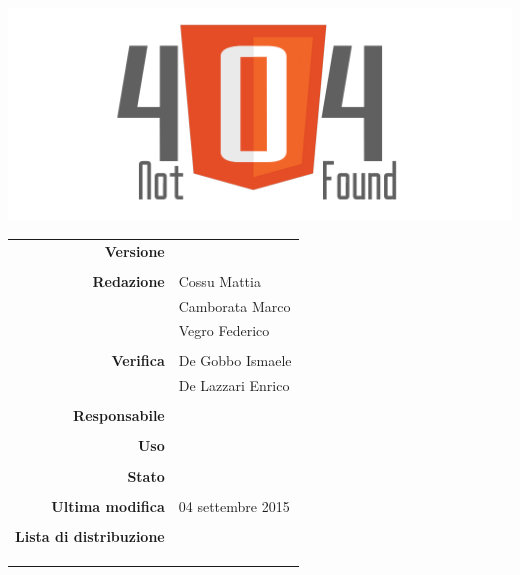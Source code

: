 \thispagestyle{empty}

\begin{titlepage}

	\begin{center}
	\begin{Huge}
		\textbf{\gruppo} \\
	\end{Huge}
	\vspace{0.5cm}
	\begin{Large}
		\textbf{\capitolato}
	\end{Large}
	
	\vspace{1cm}

	\includegraphics[scale=0.35]{../logo/logo404_Extends.png}
	\vspace{1cm}
	\begin{Huge}
		\textbf{\titDoc}
	\end{Huge}
	
	\vspace{1cm}
	
	\begin{table}[h]
	\begin{center}
	\begin{tabular}{r | l}
		\textbf{Versione} & \versione \\ \\
		\textbf{Redazione} & Cossu Mattia \\ 
			& Camborata Marco \\ 
			& Vegro Federico \\ \\
		\textbf{Verifica} & De Gobbo Ismaele \\ 
			& De Lazzari Enrico \\ \\
		\textbf{Responsabile} & \CaMa \\ \\
		\textbf{Uso} & \uso \\ \\
		\textbf{Stato} & \stato \\ \\
		\textbf{Ultima modifica} & 04 settembre 2015 \\ \\
		\textbf{Lista di distribuzione} & \gruppo \\
			& \Vardanega \\
			& \Cardin \\
			& \Zucchetti \\
	\end{tabular}
	\end{center}
	\end{table}
	\end{center}
\end{titlepage}